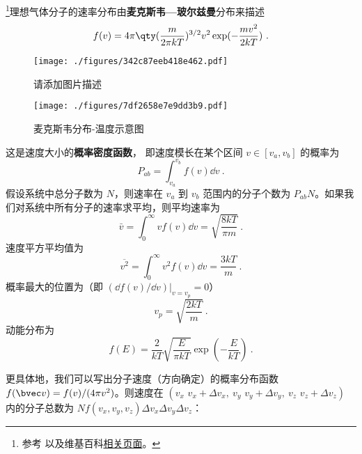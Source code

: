 \footnote{参考 \cite{新热} 以及维基百科\href{https://en.wikipedia.org/wiki/Maxwell-Boltzmann_distribution}{相关页面}。}理想气体分子的速率分布由\textbf{麦克斯韦—玻尔兹曼}分布来描述
\begin{equation}
f(v) = 4\pi \qty(\frac{m}{2\pi kT})^{3/2} v^2 \exp(-\frac{mv^2}{2kT})~.
\end{equation}

\begin{figure}[ht]
\centering
\texttt{[image: ./figures/342c87eeb418e462.pdf]}
\caption{请添加图片描述} \label{fig_MxwBzm_3}
\end{figure}

\begin{figure}[ht]
\centering
\texttt{[image: ./figures/7df2658e7e9dd3b9.pdf]}
\caption{麦克斯韦分布-温度示意图} \label{fig_MxwBzm_2}
\end{figure}

这是速度大小的\textbf{概率密度函数}， 即速度模长在某个区间 $v \in [v_a, v_b]$ 的概率为
\begin{equation}
P_{ab} = \int_{v_a}^{v_b} f(v) \dd{v}~.
\end{equation}
假设系统中总分子数为 $N$，则速率在 $v_a$ 到 $v_b$ 范围内的分子个数为 $P_{ab}N$。如果我们对系统中所有分子的速率求平均，则平均速率为
\begin{equation}
\bar v = \int_{0}^\infty v f(v)\dd v= \sqrt{\frac{8kT}{\pi m}}~.
\end{equation}
速度平方平均值为
\begin{equation}\label{eq_MxwBzm_1}
\overline {v^2} = \int_{0}^\infty v^2 f(v)\dd v = \frac{3kT}{m}~.
\end{equation}
概率最大的位置为（即 $(\dd f(v)/\dd v)|_{v=v_p}=0$）
\begin{equation}
v_p =\sqrt{\frac{2kT}{m}}~.
\end{equation}
动能分布为
\begin{equation}
f(E) = \frac{2}{kT}\sqrt{\frac{E}{\pi kT}} \exp(-\frac{E}{kT})~.
\end{equation}

更具体地，我们可以写出分子速度（方向确定）的概率分布函数 $f(\bvec v)=f(v)/(4\pi v^2)$。则速度在 $(v_x\text{~}v_x+\Delta v_x,\ v_y\text{~}v_y+\Delta v_y,\ v_z\text{~}v_z+\Delta v_z)$ 内的分子总数为 $N f(v_x,v_y,v_z)\Delta v_x\Delta v_y\Delta v_z$：

